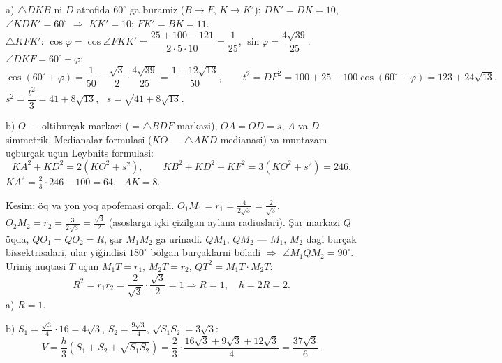 a) $\triangle DKB$ ni $D$ atrofida $60^\circ$ ga buramiz ($B\to F$, $K\to K'$): $DK'=DK=10$, $\angle KDK'=60^\circ$ $\Rightarrow$ $KK'=10$; $FK'=BK=11$.\\
$\triangle KFK'$: $\cos\varphi=\cos\angle FKK'=\dfrac{25+100-121}{2\cdot5\cdot10}=\dfrac1{25}$, $\sin\varphi=\dfrac{4\sqrt{39}}{25}$. \ $\angle DKF=60^\circ+\varphi$:
\[\cos(60^\circ+\varphi)=\frac1{50}-\frac{\sqrt3}2\cdot\frac{4\sqrt{39}}{25}=\frac{1-12\sqrt{13}}{50},\qquad t^2=DF^2=100+25-100\cos(60^\circ+\varphi)=123+24\sqrt{13}.\]
$s^2=\dfrac{t^2}3=41+8\sqrt{13}$, \ $s=\sqrt{41+8\sqrt{13}}$.

b) $O$ — oltiburçak markazi ($=\triangle BDF$ markazi), $OA=OD=s$, $A$ va $D$ simmetrik. Medianalar formulasi ($KO$ — $\triangle AKD$ medianasi) va muntazam uçburçak uçun Leybnits formulasi:
\[KA^2+KD^2=2\left(KO^2+s^2\right),\qquad KB^2+KD^2+KF^2=3\left(KO^2+s^2\right)=246.\]
$KA^2=\frac23\cdot246-100=64$, \ $AK=8$.

\newpage
{}
Kesim: öq va yon yoq apofemasi orqali. $O_1M_1=r_1=\frac{4}{2\sqrt3}=\frac2{\sqrt3}$, \ $O_2M_2=r_2=\frac3{2\sqrt3}=\frac{\sqrt3}2$ (asoslarga içki çizilgan aylana radiuslari). Şar markazi $Q$ öqda, $QO_1=QO_2=R$, şar $M_1M_2$ ga urinadi. $QM_1$, $QM_2$ — $M_1$, $M_2$ dagi burçak bissektrisalari, ular yiğindisi $180^\circ$ bölgan burçaklarni böladi $\Rightarrow$ $\angle M_1QM_2=90^\circ$. Uriniş nuqtasi $T$ uçun $M_1T=r_1$, $M_2T=r_2$, $QT^2=M_1T\cdot M_2T$:
\[R^2=r_1r_2=\frac2{\sqrt3}\cdot\frac{\sqrt3}2=1\Rightarrow R=1,\quad h=2R=2.\]
a) $R=1$.

b) $S_1=\frac{\sqrt3}4\cdot16=4\sqrt3$, $S_2=\frac{9\sqrt3}4$, $\sqrt{S_1S_2}=3\sqrt3$:
\[V=\frac h3\left(S_1+S_2+\sqrt{S_1S_2}\right)=\frac23\cdot\frac{16\sqrt3+9\sqrt3+12\sqrt3}4=\frac{37\sqrt3}6.\]

